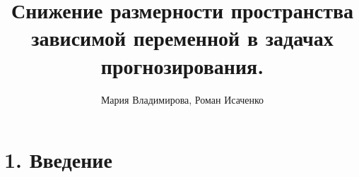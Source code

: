 \documentclass[12pt,twoside]{article}
\title
	{Снижение размерности пространства зависимой переменной в задачах прогнозирования.}
\author
	{Мария Владимирова, Роман Исаченко}
\begin{document}
\maketitle


\linenumbers
\section{1. Введение}



\end{document}
